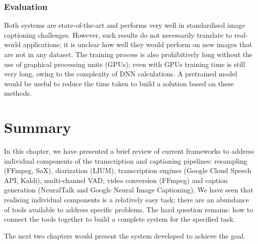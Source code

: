 \subsubsection{Evaluation}

Both systems are state-of-the-art and performs very well in standardised
image captioning challenges\cite{nrtalk,google-img}. However, such results do
not necessarily translate to real-world applications; it is unclear how well
they would perform on new images that are not in any dataset. The training
process is also prohibitively long without the use of graphical processing
units (GPUs); even with GPUs training time is still very long, owing to the 
complexity of DNN calculations. A pretrained model would be useful to reduce
the time taken to build a solution based on these methods.

\section{Summary}\label{sec:lr:summ}

In this chapter, we have presented a brief review of current frameworks to
address individual components of the transcription and captioning pipelines:
resampling (FFmpeg, SoX), diarization (LIUM), transcription engines (Google
Cloud Speech API, Kaldi), multi-channel VAD, video conversion (FFmpeg) and
caption generation (NeuralTalk and Google Neural Image Captioning). We have
seen that realising individual components is a relatively easy task; there
are an abundance of tools available to address specific problems. The hard
question remains: how to connect the tools together to build a complete
system for the specified task.

The next two chapters would present the system developed to achieve the
goal.
